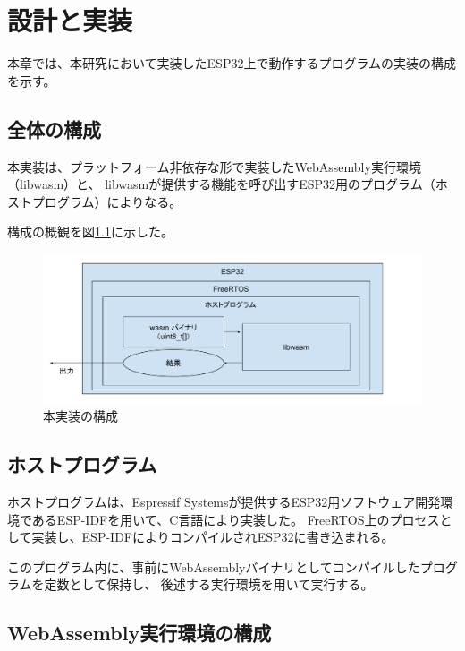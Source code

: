 \chapter{設計と実装}
\label{chap:implementation}

本章では、本研究において実装したESP32上で動作するプログラムの実装の構成を示す。

\section{全体の構成}

本実装は、プラットフォーム非依存な形で実装したWebAssembly実行環境（libwasm）と、
libwasmが提供する機能を呼び出すESP32用のプログラム（ホストプログラム）によりなる。

構成の概観を図\ref{fig:esp32_libwasm}に示した。

\begin{figure}[htbp]
  \caption{本実装の構成}
  \label{fig:esp32_libwasm}
  \begin{center}
    \includegraphics[bb=0 0 800 300,width=12cm]{img/esp32_libwasm.pdf}
  \end{center}
\end{figure}

\section{ホストプログラム}

ホストプログラムは、Espressif Systemsが提供するESP32用ソフトウェア開発環境であるESP-IDF\cite{esp_idf}を用いて、C言語により実装した。
FreeRTOS上のプロセスとして実装し、ESP-IDFによりコンパイルされESP32に書き込まれる。

このプログラム内に、事前にWebAssemblyバイナリとしてコンパイルしたプログラムを定数として保持し、
後述する実行環境を用いて実行する。

\section{WebAssembly実行環境の構成}

